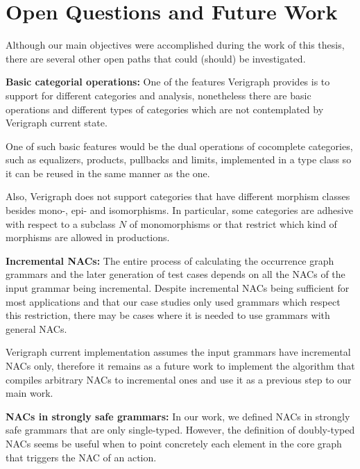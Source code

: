 \section{Open Questions and Future Work}

Although our main objectives were accomplished during the work of this thesis, there are several other open paths that could (should) be investigated. 



\textbf{Basic categorial operations:} One of the features Verigraph provides is to support for different categories and analysis, nonetheless there are basic operations and different types of categories which are not contemplated by Verigraph current state.

One of such basic features would be the dual operations of cocomplete categories, such as equalizers, products, pullbacks and limits, implemented in a  type class so it can be reused in the same manner as the  one.

Also, Verigraph does not support categories that have different morphism classes besides mono-, epi- and isomorphisms. In particular, some categories are adhesive with respect to a subclass $N$ of monomorphisms or that restrict which kind of morphisms are allowed in productions.

\textbf{Incremental NACs:} The entire process of calculating the occurrence graph grammars and the later generation of test cases depends on all the NACs of the input grammar being incremental. Despite incremental NACs being sufficient for most applications and that our case studies only used grammars which respect this restriction, there may be cases where it is needed to use grammars with general NACs.

  Verigraph current implementation assumes the input grammars have incremental NACs only, therefore it remains as a future work to implement the algorithm that compiles arbitrary NACs to incremental ones and use it as a previous step to our main work.

\textbf{NACs in strongly safe grammars:} In our work, we defined NACs in strongly safe grammars that are only single-typed. However, the definition of doubly-typed NACs seems be useful when to point concretely each element in the core graph that triggers the NAC of an action.

